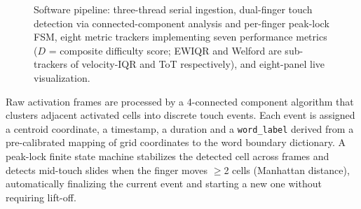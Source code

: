 \documentclass[conference]{IEEEtran}
\begin{document}
\begin{figure}[!htp]
{%
    }
    \caption{Software pipeline: three-thread serial ingestion, dual-finger
    touch detection via connected-component analysis and per-finger
    peak-lock FSM, eight metric trackers implementing seven performance metrics
    ($D$ = composite difficulty score; EWIQR and Welford are sub-trackers
    of velocity-IQR and ToT respectively), and eight-panel live visualization.}
    \label{fig:sw_flow}
    \vspace{-3mm}
    \end{figure}


    Raw activation frames are processed by a 4-connected component
    algorithm that clusters adjacent activated cells into discrete touch
    events. Each event is assigned a centroid coordinate, a timestamp, a duration and a
    \texttt{word\_label} derived from a pre-calibrated mapping of grid
    coordinates to the word boundary dictionary. A peak-lock finite state
    machine stabilizes the detected cell across frames and detects
    mid-touch slides when the finger moves $\geq$2 cells (Manhattan
    distance), automatically finalizing the current event and starting a
    new one without requiring lift-off.
\end{document}
